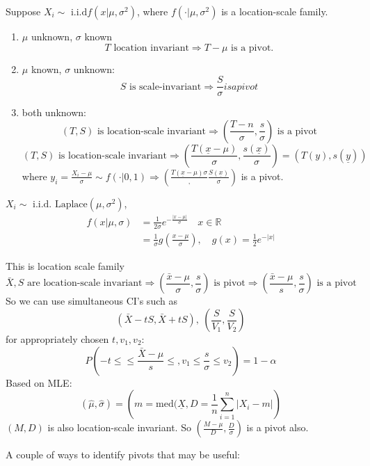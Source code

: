 \documentclass[english, 11pt]{article}
\newcommand{\lp}{\left(}
\newcommand{\rp}{\right)}
\begin{document}
\begin{thrm}\label{thrm:67}
Suppose $X_i\sim\text{ i.i.d} f(x|\mu, \sigma^2)$, where $f(\cdot|\mu, \sigma^2)$ is a location-scale family.
\begin{enumerate}
\item $\mu$ unknown, $\sigma$ known
$$
T\text{ location invariant}\Rightarrow T-\mu\text{ is a pivot}.
$$
\item $\mu$ known, $\sigma$ unknown:
$$
S \text{ is scale-invariant}\Rightarrow \frac{S}{\sigma} is a pivot
$$
\item both unknown:
$$
(T, S)\text{ is location-scale invariant}\Rightarrow\lp\frac{T-n}{\sigma}, \frac{s}{\sigma}\rp\text{ is a pivot}
$$
$$
(T, S) \text{ is location-scale invariant}\Rightarrow\lp\frac{T(\underline{x}-\mu)}{\sigma}, \frac{s(\underline{x})}{\sigma}\rp=\lp T(y), s(\underline{y})\rp
$$
where $y_i=\frac{X_i-\mu}{\sigma}\sim f(\cdot|0, 1)\Rightarrow\lp\frac{T(\underline{x}-\mu){\sigma}}, \frac{S(\underline{x})}{\sigma}\rp$ is a pivot.
\end{enumerate}
\end{thrm}


\begin{exmp}\label{exmp:68}
$X_i\sim \text{ i.i.d. Laplace}(\mu, \sigma^2)$,
$$
\begin{aligned}
f(x|\mu, \sigma)&=\frac{1}{2\sigma}e^{-\frac{|x-\mu|}{\sigma}}\quad x\in \mathbb{R}\\
&=\frac{1}{\sigma}g\lp\frac{x-\mu}{\sigma}\rp, \quad g(x)=\frac{1}{2}e^{-|x|}
\end{aligned}
$$

This is location scale family
$$
\bar{X}, S \text{ are location-scale invariant}\Rightarrow\lp\frac{\bar{x}-\mu}{\sigma}, \frac{s}{\sigma}\rp\text{ is pivot}\Rightarrow \lp\frac{\bar{x}-\mu}{s}, \frac{s}{\sigma}\rp\text{ is a pivot}
$$
So we can use simultaneous CI's such as
$$
(\bar{X}-tS, \bar{X}+tS), ~\lp\frac{S}{V_1}, \frac{S}{V_2}\rp
$$
for appropriately chosen $t, v_1, v_2$:
$$
P\lp-t\leqslant\leqslant\frac{\bar{X}-\mu}{s}\leqslant, v_1\leqslant\frac{s}{\sigma}\leqslant v_2\rp=1-\alpha
$$
Based on MLE:
$$
(\hat{\mu}, \hat{\sigma})=\lp m=\text{med}(\underline{X}, D=\frac{1}{n}\sum_{i=1}^n|X_i-m|\rp
$$
$(M, D)$ is also location-scale invariant. So $\lp\frac{M-\mu}{D}, \frac{D}{\sigma}\rp$ is a pivot also.
\end{exmp}


A couple of ways to identify pivots that may be useful:
\end{document}
